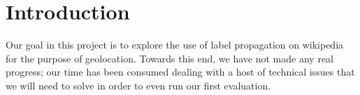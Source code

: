 \section{Introduction}
Our goal in this project is to explore the use of label propagation on
wikipedia for the purpose of geolocation.
Towards this end, we have not made any real progress; our time has been
consumed dealing with a host of technical issues that we will need to solve in
order to even run our first evaluation.
